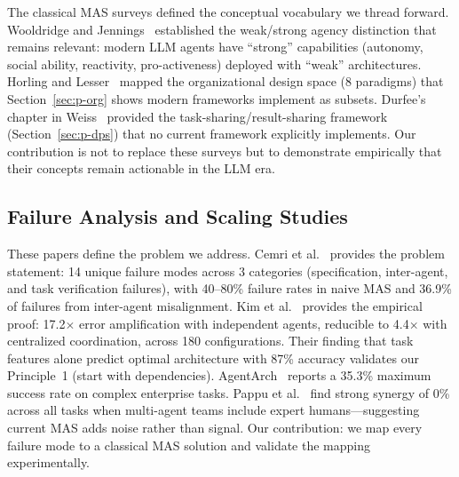 \documentclass{article}
\begin{document}
The classical MAS surveys defined the conceptual vocabulary we thread forward.
Wooldridge and Jennings~\citep{wooldridge1995intelligent} established the weak/strong
agency distinction that remains relevant: modern LLM agents have ``strong'' capabilities
(autonomy, social ability, reactivity, pro-activeness) deployed with ``weak''
architectures. Horling and Lesser~\citep{horling2004survey} mapped the organizational
design space (8 paradigms) that Section~\ref{sec:p-org} shows modern frameworks
implement as subsets. Durfee's chapter in Weiss~\citep{durfee1999distributed} provided
the task-sharing/result-sharing framework (Section~\ref{sec:p-dps}) that no current
framework explicitly implements. Our contribution is not to replace these surveys but
to demonstrate empirically that their concepts remain actionable in the LLM era.

\subsection{Failure Analysis and Scaling Studies}
\label{sec:rel-failure}

%
%

These papers define the problem we address. Cemri et al.~\citep{cemri2025fail}
provides the problem statement: 14 unique failure modes across 3 categories
(specification, inter-agent, and task verification failures), with 40--80\% failure
rates in naive MAS and 36.9\% of failures from inter-agent misalignment.
Kim et al.~\citep{kim2025scaling} provides the empirical proof: 17.2$\times$ error
amplification with independent agents, reducible to 4.4$\times$ with centralized
coordination, across 180 configurations. Their finding that task features alone
predict optimal architecture with 87\% accuracy validates our Principle~1 (start with
dependencies). AgentArch~\citep{agentarch2025} reports a 35.3\% maximum success rate
on complex enterprise tasks. Pappu et al.~\citep{pappu2026teams} find strong synergy
of 0\% across all tasks when multi-agent teams include expert humans---suggesting
current MAS adds noise rather than signal. Our contribution: we map every failure mode
to a classical MAS solution and validate the mapping experimentally.
\end{document}
